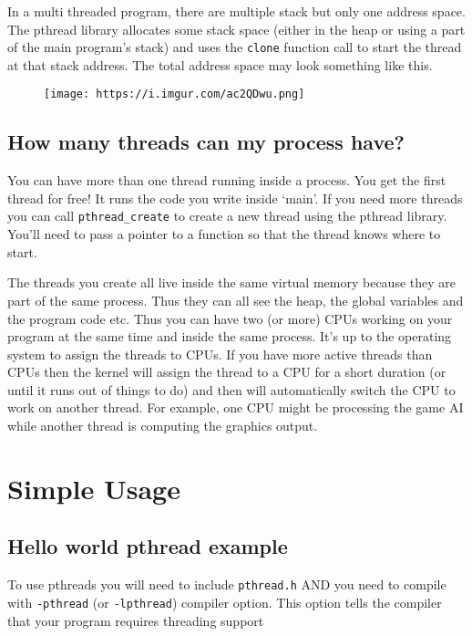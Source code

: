 In a multi threaded program, there are multiple stack but only one
address space. The pthread library allocates some stack space (either in
the heap or using a part of the main program's stack) and uses the
\texttt{clone} function call to start the thread at that stack address.
The total address space may look something like this.

\begin{figure}[htbp]
\centering
\texttt{[image: https://i.imgur.com/ac2QDwu.png]}
\caption{}
\end{figure}

\subsection{How many threads can my process
have?}\label{how-many-threads-can-my-process-have}

You can have more than one thread running inside a process. You get the
first thread for free! It runs the code you write inside `main'. If you
need more threads you can call \texttt{pthread\_create} to create a new
thread using the pthread library. You'll need to pass a pointer to a
function so that the thread knows where to start.

The threads you create all live inside the same virtual memory because
they are part of the same process. Thus they can all see the heap, the
global variables and the program code etc. Thus you can have two (or
more) CPUs working on your program at the same time and inside the same
process. It's up to the operating system to assign the threads to CPUs.
If you have more active threads than CPUs then the kernel will assign
the thread to a CPU for a short duration (or until it runs out of things
to do) and then will automatically switch the CPU to work on another
thread. For example, one CPU might be processing the game AI while
another thread is computing the graphics output.

\section{Simple Usage}\label{simple-usage}

\subsection{Hello world pthread
example}\label{hello-world-pthread-example}

To use pthreads you will need to include \texttt{pthread.h} AND you need
to compile with \texttt{-pthread} (or \texttt{-lpthread}) compiler
option. This option tells the compiler that your program requires
threading support

